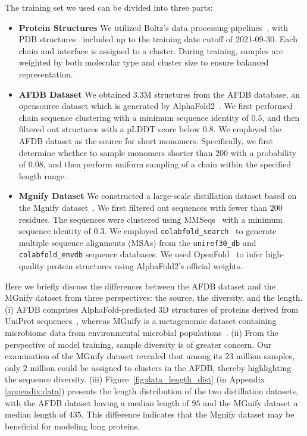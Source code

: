 The training set we used can be divided into three parts: 
\begin{itemize}
    \item \textbf{Protein Structures} We utilized Boltz's data processing pipelines~\cite{passaro2025boltz}, with PDB structures~\cite{berman2000protein} included up to the training date cutoff of 2021-09-30. Each chain and interface is assigned to a cluster. During training, samples are weighted by both molecular type and cluster size to ensure balanced representation.
    \item \textbf{AFDB Dataset} We obtained $3.3$M structures from the AFDB database, an opensource dataset which is generated by AlphaFold2~\cite{varadi2022alphafold}. We first performed chain sequence clustering with a minimum sequence identity of $0.5$, and then filtered out structures with a pLDDT score below $0.8$. We employed the AFDB dataset as the source for short monomers. Specifically, we first determine whether to sample monomers shorter than $200$ with a probability of $0.08$, and then perform uniform sampling of a chain within the specified length range.
    \item \textbf{Mgnify Dataset} We constructed a large-scale distillation dataset based on the Mgnify dataset~\cite{mitchell2020mgnify,evans2021protein}. We first filtered out sequences with fewer than $200$ residues. The sequences were clustered using MMSeqs~\cite{steinegger2017mmseqs2} with a minimum sequence identity of $0.3$. We employed \texttt{colabfold\_search}~\cite{mirdita2022colabfold} to generate multiple sequence alignments (MSAs) from the \texttt{uniref30\_db} and \texttt{colabfold\_envdb} sequence databases. We used OpenFold~\cite{ahdritz2024openfold} to infer high-quality protein structures using AlphaFold2's official weights. %
\end{itemize}




Here we briefly discuss the differences between the AFDB dataset and the MGnify dataset from three perspectives: the source, the diversity, and the length. (i) AFDB comprises AlphaFold-predicted 3D structures of proteins derived from UniProt sequences~\cite{uniprot2019uniprot}, whereas MGnify is a metagenomic dataset containing microbiome data from environmental microbial populations~\cite{mitchell2020mgnify}. (ii) From the perspective of model training, sample diversity is of greater concern. Our examination of the MGnify dataset revealed that among its $23$ million samples, only $2$ million could be assigned to clusters in the AFDB, thereby highlighting the sequence diversity. (iii) Figure~\ref{fig:data_length_dist} (in Appendix \ref{appendix:data}) presents the length distribution of the two distillation datasets, with the AFDB dataset having a median length of $95$ and the MGnify dataset a median length of $435$. This difference indicates that the Mgnify dataset may be beneficial for modeling long proteins.



